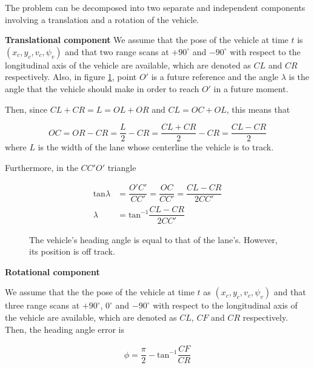 \documentclass[oneside,12pt]{article}
\begin{document}
    The problem can be decomposed into two separate and independent
    components involving a translation and a rotation of the vehicle.


    \textbf{Translational component}
    We assume that the pose of the vehicle at time $t$ is
    $(x_c, y_c, v_c, \psi_v)$ and that two range scans at $+90^\circ$ and
    $-90^\circ$ with respect to the longitudinal axis of the
    vehicle are available, which are denoted as $CL$ and $CR$ respectively. Also,
    in figure \ref{fig:centerline_pid_translation}, point $O'$ is a future
    reference and the angle $\lambda$ is the angle that the vehicle should
    make in order to reach $O'$ in a future moment.

    Then, since $CL + CR = L = OL + OR$ and $CL = OC + OL$, this means that

    \begin{equation}
      OC = OR - CR = \dfrac{L}{2} - CR = \dfrac{CL + CR}{2} - CR = \dfrac{CL-CR}{2}
    \end{equation}
    where $L$ is the width of the lane whose centerline the vehicle is to track.

    Furthermore, in the $CC'O'$ triangle

    \begin{align}
      \text{tan}\lambda &= \dfrac{O'C'}{CC'} = \dfrac{OC}{CC'} = \dfrac{CL-CR}{2CC'} \\
      \lambda &= \text{tan}^{-1}\dfrac{CL-CR}{2CC'}
    \end{align}


    \begin{figure}[H]\centering
      \scalebox{1}{}
      \caption{The vehicle's heading angle is equal to that of the lane's.
        However, its position is off track.}
      \label{fig:centerline_pid_translation}
    \end{figure}

    \textbf{Rotational component}


    We assume that the the pose of the vehicle at time $t$ as
    $(x_c, y_c, v_c, \psi_v)$ and that three range scans
    at $+90^\circ$, $0^\circ$ and $-90^\circ$ with respect to the
    longitudinal axis of the vehicle are available, which are denoted as
    $CL$, $CF$ and $CR$ respectively. Then, the heading angle error is

    \begin{align}
      \phi = \dfrac{\pi}{2} - \text{tan}^{-1}\dfrac{CF}{CR}
    \end{align}
\end{document}
